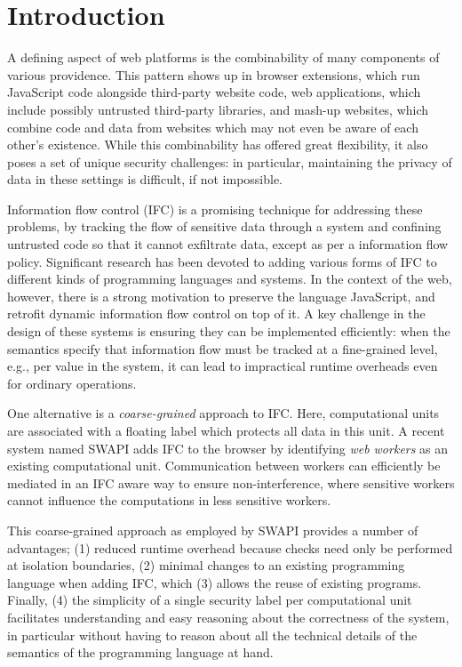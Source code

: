 \section{Introduction}
\label{sec:intro}

A defining aspect of web platforms is the combinability of many
components of various providence.  This pattern shows up in browser
extensions, which run JavaScript code alongside third-party website
code, web applications, which include possibly untrusted third-party
libraries, and mash-up websites, which combine code and data from
websites which may not even be aware of each other's existence.  While
this combinability has offered great flexibility, it also poses a set of
unique security challenges: in particular, maintaining the privacy of
data in these settings is difficult, if not impossible.

Information flow control (IFC) is a promising technique for addressing these
problems, by tracking the flow of sensitive data through a system and
confining untrusted code so that it cannot exfiltrate data, except as
per a information flow policy.  Significant research has been devoted to
adding various forms of IFC to different kinds of programming languages
and systems.  In the context of the web, however, there is a strong
motivation to preserve the language JavaScript, and retrofit dynamic information
flow control on top of it.  A key challenge in the design of these
systems is ensuring they can be implemented efficiently: when the
semantics specify that information flow must be tracked at a
fine-grained level, e.g., per value in the system,  it can lead to
impractical runtime overheads even for ordinary operations.

One alternative is a \textit{coarse-grained} approach to IFC.  Here,
computational units are associated with a floating label which protects
all data in this unit.  A recent system named SWAPI adds IFC to the
browser by identifying \emph{web workers} as an existing computational
unit.  Communication between workers can efficiently be mediated in an
IFC aware way to ensure non-interference, where sensitive workers cannot
influence the computations in less sensitive workers.

This coarse-grained approach as employed by SWAPI provides a number
of advantages; (1) reduced runtime overhead because checks need only
be performed at isolation boundaries, (2) minimal changes to an
existing programming language when adding IFC, which (3) allows
the reuse of existing programs.  Finally, (4) the simplicity
of a single security label per computational unit facilitates
understanding and easy reasoning about the correctness of the
system, in particular without having to reason about all the
technical details of the semantics of the programming language
at hand.

